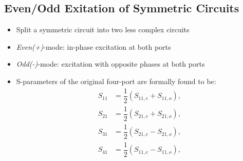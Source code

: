 \subsection{Even/Odd Exitation of Symmetric Circuits}
\begin{itemize}
    \itemsep0pt
    \item Split a symmetric circuit into two less complex circuits
    \item \textit{Even(+)}-mode: in-phase excitation at both ports
    \item \textit{Odd(-)}-mode: excitation with opposite phases at both ports
    \item S-parameters of the original four-port are formally found to be:
        \begin{align*}
            S_{11} &= \dfrac{1}{2} (S_{11,e} + S_{11,o}),\\
            S_{21} &= \dfrac{1}{2} (S_{21,e} + S_{21,o}),\\
            S_{31} &= \dfrac{1}{2} (S_{21,e} - S_{21,o}),\\
            S_{41} &= \dfrac{1}{2} (S_{11,e} - S_{11,o}),\\
        \end{align*}
\end{itemize}


